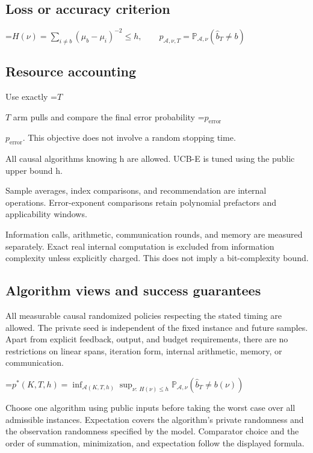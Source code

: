 \documentclass[10pt,a4paper]{article}
\newcommand{\AtlasMath}[1]{\par\begingroup\centering\setbox0=\hbox{$\displaystyle #1$}\ifdim\wd0>1.4\linewidth\typeout{ATLAS WIDE FORMULA: \the\wd0}\fi\ifdim\wd0>\linewidth\resizebox{\linewidth}{!}{\box0}\else\box0\fi\par\endgroup}
\newcommand{\AtlasInlineMath}[1]{\begingroup\setbox0=\hbox{$#1$}\ifdim\wd0>.4\linewidth\endgroup\AtlasMath{#1}\else\endgroup$#1$\fi}
\begin{document}
\subsection{Loss or accuracy criterion}

\AtlasMath{H(\nu)=\sum_{i\ne b}(\mu_b-\mu_i)^{-2}\le h,\qquad p_{\mathcal{A},\nu,T}=\mathbb{P}_{\mathcal{A},\nu}(\widehat{b}_T\ne b)}


\subsection{Resource accounting}
Use exactly \AtlasInlineMath{T} arm pulls and compare the final error probability \AtlasInlineMath{p_{\mathrm{error}}}. This objective does not involve a random stopping time.

All causal algorithms knowing h are allowed. UCB-E is tuned using the public upper bound h.

Sample averages, index comparisons, and recommendation are internal operations. Error-exponent comparisons retain polynomial prefactors and applicability windows.

Information calls, arithmetic, communication rounds, and memory are measured separately. Exact real internal computation is excluded from information complexity unless explicitly charged. This does not imply a bit-complexity bound.

\subsection{Algorithm views and success guarantees}
All measurable causal randomized policies respecting the stated timing are allowed. The private seed is independent of the fixed instance and future samples. Apart from explicit feedback, output, and budget requirements, there are no restrictions on linear spans, iteration form, internal arithmetic, memory, or communication.


\AtlasMath{p^*(K,T,h)=\inf_{\mathcal{A}(K,T,h)}\sup_{\nu:\ H(\nu)\le h}\mathbb{P}_{\mathcal{A},\nu}(\widehat{b}_T\ne b(\nu))}


Choose one algorithm using public inputs before taking the worst case over all admissible instances. Expectation covers the algorithm's private randomness and the observation randomness specified by the model. Comparator choice and the order of summation, minimization, and expectation follow the displayed formula.
\end{document}
